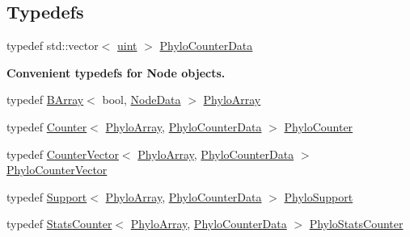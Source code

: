 \subsection*{Typedefs}
\begin{DoxyCompactItemize}
\item 
typedef std\+::vector$<$ \hyperlink{namespacebarry_a11dfc53ddb4672278319aa04f1e09a6c}{uint} $>$ \hyperlink{namespacebarry_1_1counters_1_1phylo_a6ecc0d8ab76f8dc2db152221a8e9e95a}{Phylo\+Counter\+Data}
\end{DoxyCompactItemize}
\begin{Indent}\textbf{ Convenient typedefs for Node objects.}\par
\begin{DoxyCompactItemize}
\item 
typedef \hyperlink{classbarry_1_1_b_array}{B\+Array}$<$ bool, \hyperlink{classbarry_1_1counters_1_1phylo_1_1_node_data}{Node\+Data} $>$ \hyperlink{namespacebarry_1_1counters_1_1phylo_a50a6652c16ff57d76b4099043d6a0bbb}{Phylo\+Array}
\item 
typedef \hyperlink{classbarry_1_1_counter}{Counter}$<$ \hyperlink{namespacebarry_1_1counters_1_1phylo_a50a6652c16ff57d76b4099043d6a0bbb}{Phylo\+Array}, \hyperlink{namespacebarry_1_1counters_1_1phylo_a6ecc0d8ab76f8dc2db152221a8e9e95a}{Phylo\+Counter\+Data} $>$ \hyperlink{namespacebarry_1_1counters_1_1phylo_a6523924ce3465c5b212584c57664f953}{Phylo\+Counter}
\item 
typedef \hyperlink{classbarry_1_1_counter_vector}{Counter\+Vector}$<$ \hyperlink{namespacebarry_1_1counters_1_1phylo_a50a6652c16ff57d76b4099043d6a0bbb}{Phylo\+Array}, \hyperlink{namespacebarry_1_1counters_1_1phylo_a6ecc0d8ab76f8dc2db152221a8e9e95a}{Phylo\+Counter\+Data} $>$ \hyperlink{namespacebarry_1_1counters_1_1phylo_a2f117d1cd1dff67e1539cbc0aef5766a}{Phylo\+Counter\+Vector}
\item 
typedef \hyperlink{classbarry_1_1_support}{Support}$<$ \hyperlink{namespacebarry_1_1counters_1_1phylo_a50a6652c16ff57d76b4099043d6a0bbb}{Phylo\+Array}, \hyperlink{namespacebarry_1_1counters_1_1phylo_a6ecc0d8ab76f8dc2db152221a8e9e95a}{Phylo\+Counter\+Data} $>$ \hyperlink{namespacebarry_1_1counters_1_1phylo_a40ee9e679f0f95fdeeb18cd0a2e45d48}{Phylo\+Support}
\item 
typedef \hyperlink{classbarry_1_1_stats_counter}{Stats\+Counter}$<$ \hyperlink{namespacebarry_1_1counters_1_1phylo_a50a6652c16ff57d76b4099043d6a0bbb}{Phylo\+Array}, \hyperlink{namespacebarry_1_1counters_1_1phylo_a6ecc0d8ab76f8dc2db152221a8e9e95a}{Phylo\+Counter\+Data} $>$ \hyperlink{namespacebarry_1_1counters_1_1phylo_abfefb6cff81a19d278b306a79cc011a3}{Phylo\+Stats\+Counter}
\end{DoxyCompactItemize}
\end{Indent}
